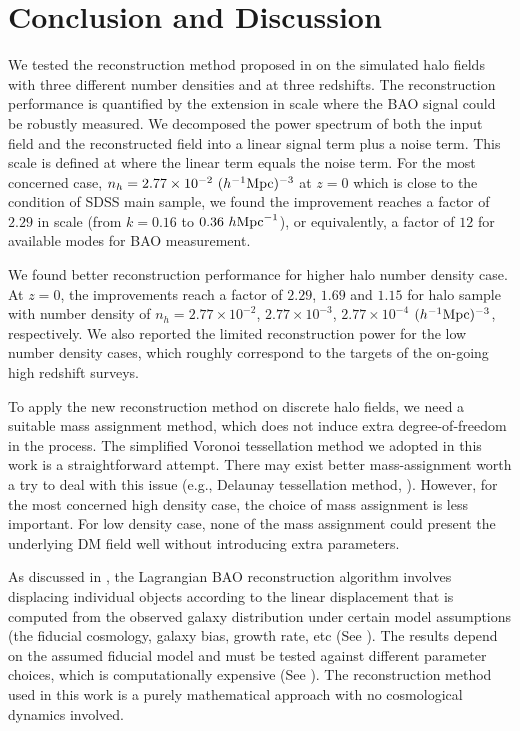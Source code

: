 \documentclass[iop]{emulateapj}
\newcommand{\mpch}{h^{-1} {\rm Mpc}}
\newcommand{\hmpc}{h {\rm Mpc}^{-1}}
\begin{document}
{%

\section{Conclusion and Discussion}
\label{sec:conclusion}

We tested the reconstruction method proposed in \citet{zhuhm16c} on the simulated halo fields with three different number densities and at three redshifts.
The reconstruction performance is quantified by the extension in scale where the BAO signal could be robustly measured.
We decomposed the power spectrum of both the input field and the reconstructed field into a linear signal term plus a noise term.
This scale is defined at where the linear term equals the noise term.
For the most concerned case, $n_h=2.77\times 10^{-2}\ (\mpch)^{-3}$ at $z=0$ which is close to the condition of SDSS main sample, we found the improvement reaches a factor of $2.29$ in scale (from $k=0.16$ to $0.36\ \hmpc$), or equivalently, a factor of $12$ for available modes for BAO measurement.

We found better reconstruction performance for higher halo number density case.
At $z=0$, the improvements reach a factor of $2.29$, $1.69$ and $1.15$ for halo sample with number density of $n_h=2.77\times 10^{-2}$, $2.77\times 10^{-3}$, $2.77\times 10^{-4}$ $(\mpch)^{-3}$, respectively.
We also reported the limited reconstruction power for the low number density cases, which roughly correspond to the targets of the on-going high redshift surveys.

To apply the new reconstruction method on discrete halo fields,
we need a suitable mass assignment method, which does not induce extra degree-of-freedom in the process.
The simplified Voronoi tessellation method we adopted in this work is a straightforward attempt.
There may exist better mass-assignment worth a try to deal with this issue (e.g., Delaunay tessellation method, \cite{Cautun11}).
However, for the most concerned high density case, the choice of mass assignment is less important.
For low density case, none of the mass assignment could present the underlying DM field well without introducing extra parameters.

As discussed in \cite{zhuhm16c},
the Lagrangian BAO reconstruction algorithm involves displacing individual objects according to the linear displacement that is computed from the observed galaxy distribution under certain model assumptions (the fiducial cosmology, galaxy bias, growth rate, etc (See \cite{Eisenstein07}). The results depend on the assumed fiducial model and must be tested against different parameter choices, which is computationally expensive (See \cite{Padmanabhan12}). The reconstruction method used in this work is a purely mathematical approach with no cosmological dynamics involved. 

}
\end{document}
